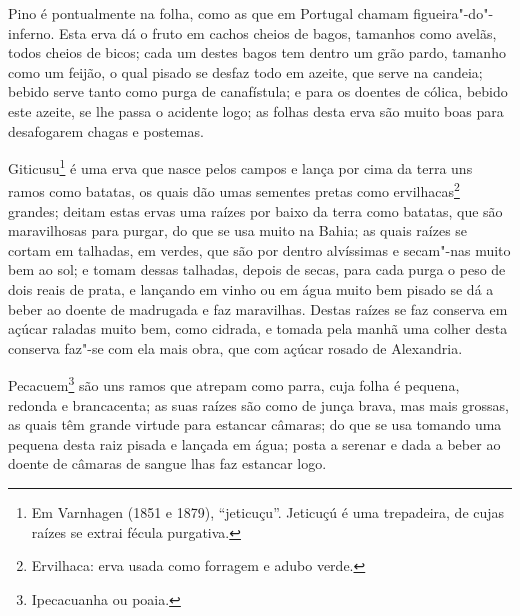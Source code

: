 \begin{linenumbers}
Pino é pontualmente na folha, como as que em Portugal chamam figueira"-do"-inferno. Esta
erva dá o fruto em cachos cheios de bagos, tamanhos como avelãs, todos cheios de bicos;
cada um destes bagos tem dentro um grão pardo, tamanho como um feijão, o qual pisado se
desfaz todo em azeite, que serve na candeia; bebido serve tanto como purga de canafístula;
e para os doentes de cólica, bebido este azeite, se lhe passa o acidente logo; as folhas
desta erva são muito boas para desafogarem chagas e postemas.

Giticusu\footnote{ Em Varnhagen (1851 e 1879), ``jeticuçu''. Jeticuçú é uma trepadeira, de
cujas raízes se extrai fécula purgativa.} é uma erva que nasce pelos campos e lança por
cima da terra uns ramos como batatas, os quais dão umas sementes pretas como
ervilhacas\footnote{ Ervilhaca: erva usada como forragem e adubo verde.} grandes; deitam
estas ervas uma raízes por baixo da terra como batatas, que são maravilhosas para purgar,
do que se usa muito na Bahia; as quais raízes se cortam em talhadas, em verdes, que são
por dentro alvíssimas e secam"-nas muito bem ao sol; e tomam dessas talhadas, depois de
secas, para cada purga o peso de dois reais de prata, e lançando em vinho ou em água muito
bem pisado se dá a beber ao doente de madrugada e faz maravilhas. Destas raízes se faz
conserva em açúcar raladas muito bem, como cidrada, e tomada pela manhã uma colher desta
conserva faz"-se com ela mais obra, que com açúcar rosado de Alexandria.

Pecacuem\footnote{ Ipecacuanha ou poaia.} são uns ramos que atrepam como parra, cuja folha
é pequena, redonda e brancacenta; as suas raízes são como de junça brava, mas mais
grossas, as quais têm grande virtude para estancar câmaras; do que se usa tomando uma
pequena desta raiz pisada e lançada em água; posta a serenar e dada a beber ao doente de
câmaras de sangue lhas faz estancar logo.


\end{linenumbers}
